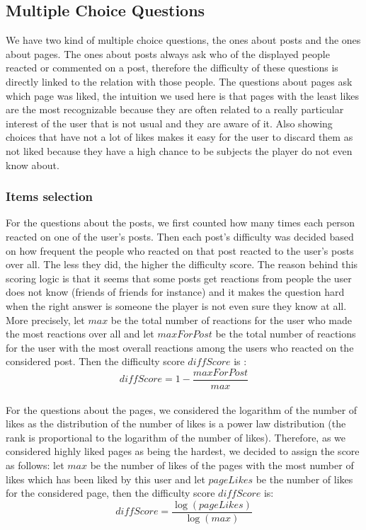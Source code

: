 \subsection{Multiple Choice Questions}
We have two kind of multiple choice questions, the ones about posts and the ones about pages. The ones about posts always ask who of the displayed people reacted or commented on a post, therefore the difficulty of these questions is directly linked to the relation with those people. The questions about pages ask which page was liked, the intuition we used here is that pages with the least likes are the most recognizable because they are often related to a really particular interest of the user that is not usual and they are aware of it. Also showing choices that have not a lot of likes makes it easy for the user to discard them as not liked because they have a high chance to be subjects the player do not even know about.
\subsubsection{Items selection}
For the questions about the posts, we first counted how many times each person reacted on one of the user's posts. Then each post's difficulty was decided based on how frequent the people who reacted on that post reacted to the user's posts over all. The less they did, the higher the difficulty score. The reason behind this scoring logic is that it seems that some posts get reactions from people the user does not know (friends of friends for instance) and it makes the question hard when the right answer is someone the player is not even sure they know at all. More precisely, let $\mathit{max}$ be the total number of reactions for the user who made the most reactions over all and let $\mathit{maxForPost}$ be the total number of reactions for the user with the most overall reactions among the users who reacted on the considered post. Then the difficulty score $\mathit{diffScore}$ is : $$\mathit{diffScore} = 1 - \frac{\mathit{maxForPost}}{\mathit{max}}$$\\
For the questions about the pages, we considered the logarithm of the number of likes as the distribution of the number of likes is a power law distribution (the rank is proportional to the logarithm of the number of likes). Therefore, as we considered highly liked pages as being the hardest, we decided to assign the score as follows: let $\mathit{max}$ be the number of likes of the pages with the most number of likes which has been liked by this user and let $\mathit{pageLikes}$ be the number of likes for the considered page, then the difficulty score $\mathit{diffScore}$ is: $$\mathit{diffScore} = \frac{\log(\mathit{pageLikes})}{\log(\mathit{max})}$$

